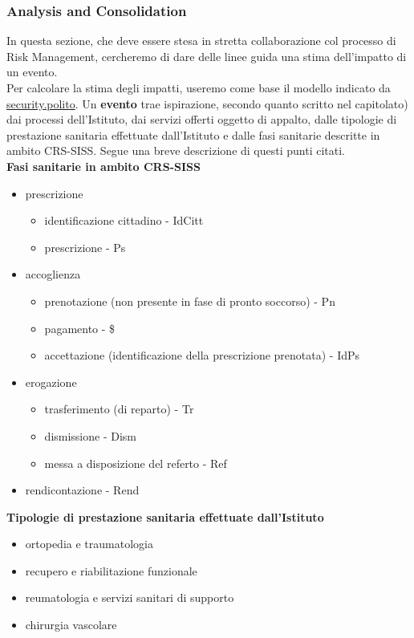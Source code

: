 \subsubsection{Analysis and Consolidation} 
\label{fineattprio}
In questa sezione, che deve essere stesa in stretta collaborazione col processo di Risk Management, cercheremo di dare delle linee guida una stima dell'impatto di un evento.\\
Per calcolare la stima degli impatti, useremo come base il modello indicato da \href{http://security.polito.it/~lioy/01jem/risk05_risk_2x.pdf}{security.polito}.
Un \textbf{evento} trae ispirazione, secondo quanto scritto nel capitolato) dai processi dell'Istituto, dai servizi offerti oggetto di appalto, dalle tipologie di prestazione sanitaria effettuate dall'Istituto e dalle fasi sanitarie descritte in ambito CRS-SISS. Segue una breve descrizione di questi punti citati.
\vspace{1cm}
\\
\textbf{Fasi sanitarie in ambito CRS-SISS}
\begin{itemize}
    \item prescrizione 
      \begin{itemize}
          \item identificazione cittadino - IdCitt
          \item prescrizione - Ps
      \end{itemize}
    \item accoglienza
        \begin{itemize}
           \item prenotazione (non presente in fase di pronto soccorso) - Pn
            \item pagamento -  \$
            \item accettazione (identificazione della prescrizione prenotata) - IdPs
         \end{itemize}
    \item erogazione 
        \begin{itemize}
          \item trasferimento (di reparto) - Tr
          \item dismissione - Dism
          \item messa a disposizione del referto - Ref
        \end{itemize}
    \item rendicontazione - Rend
 \end{itemize}
 \vspace{1cm}
 \textbf{Tipologie di prestazione sanitaria effettuate dall'Istituto}
  \begin{itemize}
  \item ortopedia e traumatologia
  \item recupero e riabilitazione funzionale
  \item reumatologia e servizi sanitari di supporto
  \item chirurgia vascolare
  \end{itemize}

